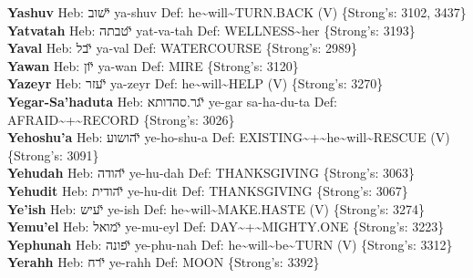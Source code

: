 {\textbf{Yashuv} Heb: {\large\H ישוב} ya-shuv Def: he\textasciitilde{}will\textasciitilde{}TURN.BACK (V) \{Strong's: 3102, 3437\}\hfill{}\\

\textbf{Yatvatah} Heb: {\large\H יטבתה} yat-va-tah Def: WELLNESS\textasciitilde{}her \{Strong's: 3193\}\hfill{}\\

\textbf{Yaval} Heb: {\large\H יבל} ya-val Def: WATERCOURSE \{Strong's: 2989\}\hfill{}\\

\textbf{Yawan} Heb: {\large\H יון} ya-wan Def: MIRE \{Strong's: 3120\}\hfill{}\\

\textbf{Yazeyr} Heb: {\large\H יעזר} ya-zeyr Def: he\textasciitilde{}will\textasciitilde{}HELP (V) \{Strong's: 3270\}\hfill{}\\

\textbf{Yegar-Sa'haduta} Heb: {\large\H יגר.סהדותא} ye-gar sa-ha-du-ta Def: AFRAID\textasciitilde{}+\textasciitilde{}RECORD \{Strong's: 3026\}\hfill{}\\

\textbf{Yehoshu'a} Heb: {\large\H יהושוע} ye-ho-shu-a Def: EXISTING\textasciitilde{}+\textasciitilde{}he\textasciitilde{}will\textasciitilde{}RESCUE (V) \{Strong's: 3091\}\hfill{}\\

\textbf{Yehudah} Heb: {\large\H יהודה} ye-hu-dah Def: THANKSGIVING \{Strong's: 3063\}\hfill{}\\

\textbf{Yehudit} Heb: {\large\H יהודית} ye-hu-dit Def: THANKSGIVING \{Strong's: 3067\}\hfill{}\\

\textbf{Ye'ish} Heb: {\large\H יעיש} ye-ish Def: he\textasciitilde{}will\textasciitilde{}MAKE.HASTE (V) \{Strong's: 3274\}\hfill{}\\

\textbf{Yemu'el} Heb: {\large\H ימואל} ye-mu-eyl Def: DAY\textasciitilde{}+\textasciitilde{}MIGHTY.ONE \{Strong's: 3223\}\hfill{}\\

\textbf{Yephunah} Heb: {\large\H יפונה} ye-phu-nah Def: he\textasciitilde{}will\textasciitilde{}be\textasciitilde{}TURN (V) \{Strong's: 3312\}\hfill{}\\

\textbf{Yerahh} Heb: {\large\H ירח} ye-rahh Def: MOON \{Strong's: 3392\}\hfill{}\\

}
